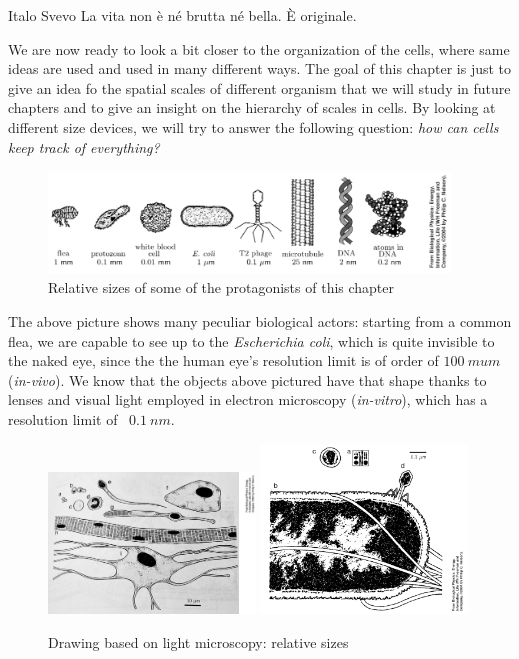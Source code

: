 \documentclass[../main/main.tex]{subfiles}
\begin{document}
\begin{chapquote}{Italo Svevo}
    La vita non è né brutta né bella. È originale.
\end{chapquote}

We are now ready to look a bit closer to the organization of the cells, where same ideas are used and used in many different ways.  The goal of this chapter is just to give an idea fo the spatial scales of different organism that we will study in future chapters and to give an insight on the hierarchy of scales in cells. By looking at different size devices, we will try to answer the following question: \emph{how can cells keep track of everything?}  
\begin{figure}[h!]
    \centering
    \includegraphics[width=0.95\textwidth]{../frontespizio/tikz/1_lesson/spatial_scales.PNG}
    \caption{Relative sizes of some of the protagonists of this chapter}    
\end{figure}
The above picture shows many peculiar biological actors: starting from a common flea, we are capable to see up to the \emph{Escherichia coli}, which is quite invisible to the naked eye, since the the human eye's resolution limit is of order of $100\: mu m$ (\emph{in-vivo}). We know that the objects above pictured have that shape thanks to lenses and visual light employed in electron microscopy (\emph{in-vitro}), which has a resolution limit of ~$0.1\:nm$.

\begin{figure}[h!]
    \centering
    \includegraphics[width=0.49\textwidth]{../frontespizio/tikz/1_lesson/Drawing.jpg}
    \includegraphics[width=0.49\textwidth]{../frontespizio/tikz/1_lesson/drawing_electron.PNG}
    \caption{Drawing based on light microscopy: relative sizes}    
\end{figure}
\end{document}
